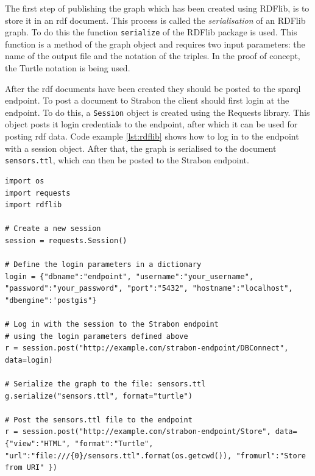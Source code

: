The first step of publishing the graph which has been created using RDFlib, is to store it in an \ac{rdf} document. This process is called the \textit{serialisation} of an RDFlib graph. To do this the function \texttt{serialize} of the RDFlib package is used. This function is a method of the graph object and requires two input parameters: the name of the output file and the notation of the triples. In the proof of concept, the Turtle notation is being used. 

After the \ac{rdf} documents have been created they should be posted to the \ac{sparql} endpoint. To post a document to Strabon the client should first login at the endpoint. To do this, a \texttt{Session} object is created using the Requests library. This object posts it login credentials to the endpoint, after which it can be used for posting \ac{rdf} data. Code example \ref{lst:rdflib} shows how to log in to the endpoint with a session object. After that, the graph is serialised to the document \texttt{sensors.ttl}, which can then be posted to the Strabon endpoint.   

\begin{lstlisting}[float,caption={Serializing the RDFlib graph object and posting it to the Strabon endpoint}, label={lst:rdflib2}]
import os
import requests
import rdflib

# Create a new session
session = requests.Session()

# Define the login parameters in a dictionary
login = {"dbname":"endpoint", "username":"your_username", "password":"your_password", "port":"5432", "hostname":"localhost", "dbengine":'postgis"}

# Log in with the session to the Strabon endpoint 
# using the login parameters defined above
r = session.post("http://example.com/strabon-endpoint/DBConnect", data=login)

# Serialize the graph to the file: sensors.ttl
g.serialize("sensors.ttl", format="turtle")

# Post the sensors.ttl file to the endpoint
r = session.post("http://example.com/strabon-endpoint/Store", data={"view":"HTML", "format":"Turtle", "url":"file:///{0}/sensors.ttl".format(os.getcwd()), "fromurl":"Store from URI" }) 
\end{lstlisting}  


